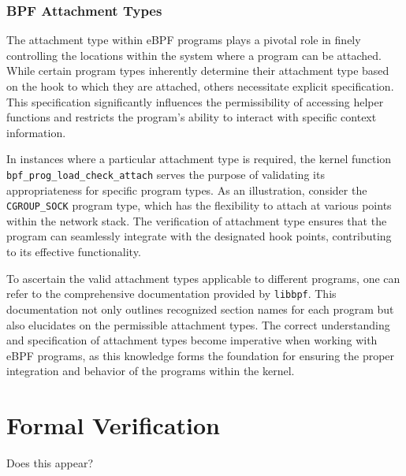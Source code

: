 \subsubsection{BPF Attachment Types}


The attachment type within eBPF programs plays a pivotal role in finely controlling the locations within the system where a program can be attached. While certain program types inherently determine their attachment type based on the hook to which they are attached, others necessitate explicit specification. This specification significantly influences the permissibility of accessing helper functions and restricts the program's ability to interact with specific context information.

In instances where a particular attachment type is required, the kernel function \texttt{bpf\_prog\_load\_check\_attach} serves the purpose of validating its appropriateness for specific program types. As an illustration, consider the \texttt{CGROUP\_SOCK} program type, which has the flexibility to attach at various points within the network stack. The verification of attachment type ensures that the program can seamlessly integrate with the designated hook points, contributing to its effective functionality.

To ascertain the valid attachment types applicable to different programs, one can refer to the comprehensive documentation provided by \texttt{libbpf}. This documentation not only outlines recognized section names for each program but also elucidates on the permissible attachment types. The correct understanding and specification of attachment types become imperative when working with eBPF programs, as this knowledge forms the foundation for ensuring the proper integration and behavior of the programs within the kernel.

\section{Formal Verification}

Does this appear?

